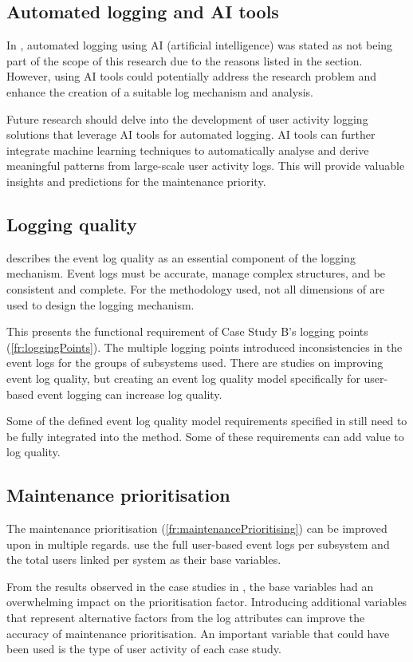 \subsection{Automated logging and AI tools}
In , automated logging using AI (artificial intelligence) was stated as not being part of the scope of this research due to the reasons listed in the section. However, using AI tools could potentially address the research problem and enhance the creation of a suitable log mechanism and analysis. \par Future research should delve into the development of user activity logging solutions that leverage AI tools for automated logging. AI tools can further integrate machine learning techniques to automatically analyse and derive meaningful patterns from large-scale user activity logs. This will provide valuable insights and predictions for the maintenance priority. 

\subsection{Logging quality}
 describes the event log quality as an essential component of the logging mechanism. Event logs must be accurate, manage complex structures, and be consistent and complete. For the methodology used, not all dimensions of  are used to design the logging mechanism.\par This presents the functional requirement of Case Study B's logging points (\ref{fr:loggingPoints}). The multiple logging points introduced inconsistencies in the event logs for the groups of subsystems used. There are studies on improving event log quality, but creating an event log quality model specifically for user-based event logging can increase log quality. \par Some of the defined event log quality model requirements specified in  still need to be fully integrated into the method. Some of these requirements can add value to log quality.

\subsection{Maintenance prioritisation}
The maintenance prioritisation (\ref{fr:maintenancePrioritising}) can be improved upon in multiple regards.  use the full user-based event logs per subsystem and the total users linked per system as their base variables. \par From the results observed in the case studies in , the base variables had an overwhelming impact on the prioritisation factor. Introducing additional variables that represent alternative factors from the log attributes can improve the accuracy of maintenance prioritisation. An important variable that could have been used is the type of user activity of each case study.

